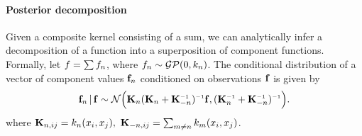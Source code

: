 \documentclass[twoside]{article}
\begin{document}
\paragraph{Posterior decomposition}
\label{sec:decomposing}
Given a composite kernel consisting of a sum, %
we can analytically infer a decomposition of a function into a superposition of component functions.
Formally,
let ${f = \sum f_n}$, where ${f_n \sim \mathcal{GP}( 0, k_n)}$.
The conditional distribution of a vector of component values ${\bf{f}}_n$ conditioned on observations ${\bf{f}}$ is given by
\[
\vf_n \given \vf \sim \mathcal{N} \Big( \vK_n (\vK_n + \vK_{-n}\inv)\inv \vf, (\vK_n\inv + \vK_{-n}\inv)\inv \Big).
\]
where ${\mathbf{K}_{n,ij} = k_n(x_i,x_j),\,\,\mathbf{K}_{-n,ij} = \sum_{m\neq n}k_m(x_i,x_j)}$. 




\end{document}
